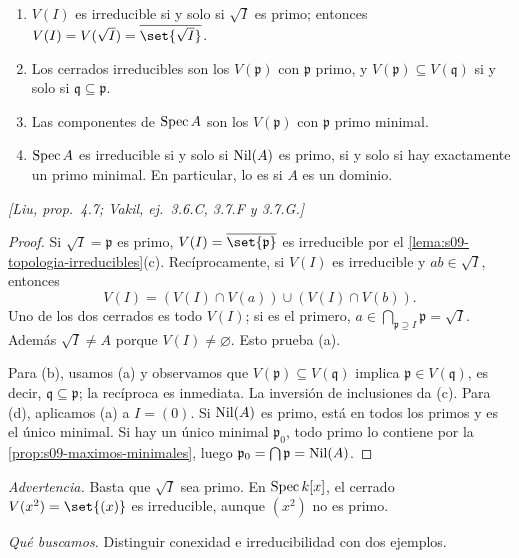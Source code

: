 \begin{prop}
\label{prop:s09-irreducibles-espectro}
\begin{enumerate}[label=(\alph*)]
\item $V(I)$ es irreducible si y solo si $\sqrt I$ es primo; entonces $V(I)=V(\sqrt I)=\overline{\set{\sqrt I}}$.
\item Los cerrados irreducibles son los $V(\mathfrak p)$ con $\mathfrak p$ primo, y $V(\mathfrak p)\subseteq V(\mathfrak q)$ si y solo si $\mathfrak q\subseteq\mathfrak p$.
\item Las componentes de $\operatorname{Spec} A$ son los $V(\mathfrak p)$ con $\mathfrak p$ primo minimal.
\item $\operatorname{Spec} A$ es irreducible si y solo si $\operatorname{Nil}(A)$ es primo, si y solo si hay exactamente un primo minimal. En particular, lo es si $A$ es un dominio.
\end{enumerate}
\emph{[Liu, prop.~4.7; Vakil, ej.~3.6.C, 3.7.F y 3.7.G.]}
\end{prop}
\begin{proof}
Si $\sqrt I=\mathfrak p$ es primo, $V(I)=\overline{\set{\mathfrak p}}$ es irreducible por el \cref{lema:s09-topologia-irreducibles}(c). Recíprocamente, si $V(I)$ es irreducible y $ab\in\sqrt I$, entonces
\[
V(I)=(V(I)\cap V(a))\cup(V(I)\cap V(b)).
\]
Uno de los dos cerrados es todo $V(I)$; si es el primero, $a\in\bigcap_{\mathfrak p\supseteq I}\mathfrak p=\sqrt I$. Además $\sqrt I\ne A$ porque $V(I)\ne\varnothing$. Esto prueba (a).

Para (b), usamos (a) y observamos que $V(\mathfrak p)\subseteq V(\mathfrak q)$ implica $\mathfrak p\in V(\mathfrak q)$, es decir, $\mathfrak q\subseteq\mathfrak p$; la recíproca es inmediata. La inversión de inclusiones da (c). Para (d), aplicamos (a) a $I=(0)$. Si $\operatorname{Nil}(A)$ es primo, está en todos los primos y es el único minimal. Si hay un único minimal $\mathfrak p_0$, todo primo lo contiene por la \cref{prop:s09-maximos-minimales}, luego $\mathfrak p_0=\bigcap\mathfrak p=\operatorname{Nil}(A)$.
\end{proof}
\emph{Advertencia.} Basta que $\sqrt I$ sea primo. En $\operatorname{Spec} k[x]$, el cerrado $V(x^2)=\set{(x)}$ es irreducible, aunque $(x^2)$ no es primo.

\emph{Qué buscamos.} Distinguir conexidad e irreducibilidad con dos ejemplos.

